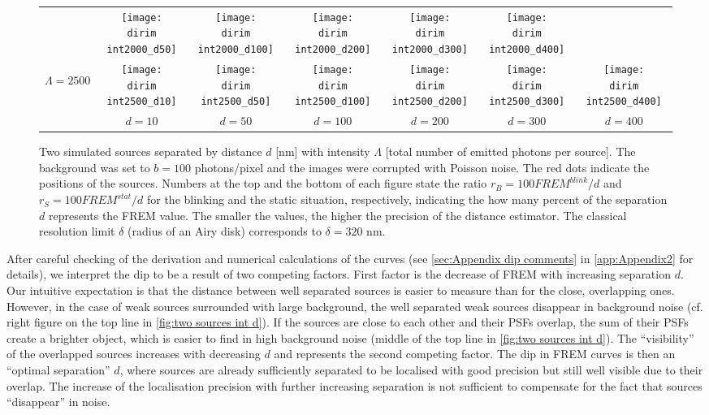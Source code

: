 \begin{figure}[!bt]
\begin{tabular}{c|cccccc}
		&\texttt{[image: \\dirim int2000\_d50]}
		&\texttt{[image: \\dirim int2000\_d100]}
		&\texttt{[image: \\dirim int2000\_d200]}
		&\texttt{[image: \\dirim int2000\_d300]}
		&\texttt{[image: \\dirim int2000\_d400]}\\
		\begin{sideways}\hspace{\vs cm}$\Lambda=2500$\end{sideways}
		&\texttt{[image: \\dirim int2500\_d10]}
		&\texttt{[image: \\dirim int2500\_d50]}
		&\texttt{[image: \\dirim int2500\_d100]}
		&\texttt{[image: \\dirim int2500\_d200]}
		&\texttt{[image: \\dirim int2500\_d300]}
		&\texttt{[image: \\dirim int2500\_d400]}\\		
		\hline	
		&$d=10$ & $d=50$ & $d=100$ & $d=200$ & $d=300$ & $d=400$\\
	\end{tabular}
	\caption{Two simulated sources separated by distance $d$ [nm] with intensity $\Lambda$ [total number of emitted photons per source]. The background was set to $b=100$ photons/pixel and the images were corrupted with Poisson noise. The red dots indicate the positions of the sources. Numbers at the top and the bottom of each figure state the ratio $r_B=100\unit{FREM}^{blink}/d$ and $r_S=100\unit{FREM}^{stat}/d$ for the blinking and the static situation, respectively, indicating the how many percent of the separation $d$ represents the FREM value. The smaller the values, the higher the precision of the distance estimator. The classical resolution limit $\delta$ (radius of an Airy disk) corresponds to $\delta=320$ nm.}
	\label{fig:two sources int d}
\end{figure}
%
After careful checking of the derivation and numerical calculations of the curves (see \autoref{sec:Appendix dip comments} in \autoref{app:Appendix2} for details), we interpret the dip to be a result of two competing factors. First factor is the decrease of FREM with increasing separation $d$. Our intuitive expectation is that the distance between well separated sources is easier to measure than for the close, overlapping ones. However, in the case of weak sources surrounded with large background, the well separated weak sources disappear in background noise (cf. right figure on the top line in \autoref{fig:two sources int d}). If the sources are close to each other and their PSFs overlap, the sum of their PSFs create a brighter object, which is easier to find in high background noise (middle of the top line in \autoref{fig:two sources int d}). The ``visibility'' of the overlapped sources increases with decreasing $d$ and represents the second competing factor. The dip in FREM curves is then an ``optimal separation'' $d$, where sources are already sufficiently separated to be localised with good precision but still well visible due to their overlap. The increase of the localisation precision with further increasing separation is not sufficient to compensate for the fact that sources ``disappear'' in noise.

